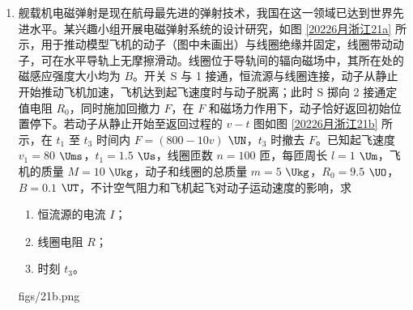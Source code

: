 \documentclass[\gkver]{gaokaozhenti}
\begin{document}
\begin{enumerate}
{	$s_{3} = 0.4$ $\Um$

	距离 C 点 $0.6$ $\Um$，综上可知当 $0.9$ $\Um$ $< h < 1.2$ $\Um$ 时

	$3l - s_{3} \leq x \leq 3l$

	代入数据得

	$2.6$ $\Um$ $\leqslant x \leqslant 3$ $\Um$
}

\item
舰载机电磁弹射是现在航母最先进的弹射技术，我国在这一领域已达到世界先进水平。某兴趣小组开展电磁弹射系统的设计研究，如图 \ref{20226月浙江21a} 所示，用于推动模型飞机的动子（图中未画出）与线圈绝缘并固定，线圈带动动子，可在水平导轨上无摩擦滑动。线圈位于导轨间的辐向磁场中，其所在处的磁感应强度大小均为 $B$。开关 S 与 1 接通，恒流源与线圈连接，动子从静止开始推动飞机加速，飞机达到起飞速度时与动子脱离；此时 S 掷向 2 接通定值电阻 $R_{0}$，同时施加回撤力 $F$，在 $F$ 和磁场力作用下，动子恰好返回初始位置停下。若动子从静止开始至返回过程的 $v-t$ 图如图 \ref{20226月浙江21b} 所示，在 $t_{1}$ 至 $t_{3}$ 时间内 $F = (800 - 10v)$ $\UN$，$t_{3}$ 时撤去 $F$。已知起飞速度 $v_{1} = 80$ $\Ums$，$t_{1} = 1.5$ $\Us$，线圈匝数 $n = 100$ 匝，每匝周长 $l = 1$ $\Um$，飞机的质量 $M = 10$ $\Ukg$，动子和线圈的总质量 $m = 5$ $\Ukg$，$R_{0} = 9.5$ $\UO$，$B = 0.1$ $\UT$，不计空气阻力和飞机起飞对动子运动速度的影响，求
\begin{enumerate}
	\item
	恒流源的电流 $I$；
	\item
	线圈电阻 $R$；
	\item
	时刻 $t_{3}$。
\end{enumerate}
{figs/21b.png}

\end{enumerate}
\end{document}
